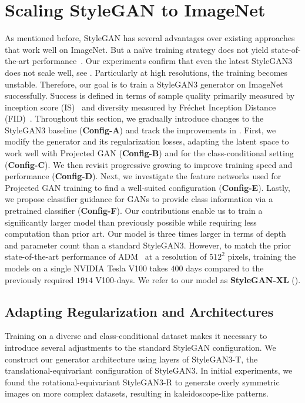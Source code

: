 \section{Scaling StyleGAN to ImageNet}
\label{sec:method}
As mentioned before, StyleGAN has several advantages over existing approaches that work well on ImageNet.
But a na\"{i}ve training strategy does not yield state-of-the-art performance~\cite{Gwern2020MISC, Grigoryev2022ICLR}.
Our experiments confirm that even the latest StyleGAN3 does not scale well, see . Particularly at high resolutions, the training becomes unstable.
Therefore, our goal is to train a StyleGAN3 generator on ImageNet successfully. Success is defined in terms of sample quality primarily measured by inception score (IS)~\cite{Salimans2016NEURIPS} and diversity measured by Fr\'echet Inception Distance (FID)~\cite{Heusel2017NEURIPS}.
Throughout this section, we gradually introduce changes to the StyleGAN3 baseline (\textbf{Config-A}) and track the improvements in . First, we modify the generator and its regularization losses, adapting the latent space to work well with Projected GAN (\textbf{Config-B}) and for the class-conditional setting (\textbf{Config-C}). We then revisit progressive growing to improve training speed and performance (\textbf{Config-D}). Next, we investigate the feature networks used for Projected GAN training to find a well-suited configuration (\textbf{Config-E}). Lastly, we propose classifier guidance for GANs to provide class information via a pretrained classifier (\textbf{Config-F}). Our contributions enable us to train a significantly larger model than previously possible while requiring less computation than prior art. Our model is three times larger in terms of depth and parameter count than a standard StyleGAN3. However, to match the prior state-of-the-art performance of ADM~\cite{Dhariwal2021NEURIPS} at a resolution of $512^2$ pixels, training the models on a single NVIDIA Tesla V100 takes $400$ days compared to the previously required $1914$ V100-days. We refer to our model as \textbf{StyleGAN-XL} ().
\system
\ablation

\subsection{Adapting Regularization and Architectures}
Training on a diverse and class-conditional dataset makes it necessary to introduce several adjustments to the standard StyleGAN configuration. We construct our generator architecture using layers of StyleGAN3-T, the translational-equivariant configuration of StyleGAN3. In initial experiments, we found the rotational-equivariant StyleGAN3-R to generate overly symmetric images on more complex datasets, resulting in kaleidoscope-like patterns. 
 
